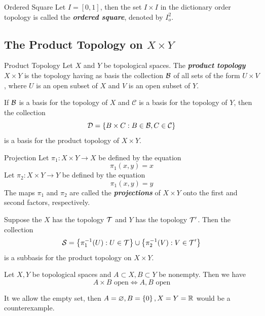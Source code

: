 \documentclass[12pt,a4paper]{article}
\begin{document}
    \begin{defi}{Ordered Square}
        Let $I=[0,1]$, then the set $I\times I$ in the dictionary order topology is called the \textbf{\textit{ordered square}}, denoted by $I_o^2$.
    \end{defi}

    \subsection{The Product Topology on $X\times Y$}
    \begin{defi}{Product Topology}
        Let $X$ and $Y$ be topological spaces. The \textbf{\textit{product topology}} $X\times Y$ is the topology having as basis the collection $\mathcal{B}$ of all sets of the form $U\times V$, where $U$ is an open subset of $X$ and $V$ is an open subset of $Y$.
    \end{defi}
    \hfill

    \begin{thm}
        If $\mathcal{B}$ is a basis for the topology of $X$ and $\mathcal{C}$ is a basis for the topology of $Y$, then the collection
        $$
        \mathcal{D}=\left\{B\times C: B\in\mathcal{B}, C\in\mathcal{C}\right\}
        $$
        is a basis for the product topology of $X\times Y$.
    \end{thm}
    \hfill

    \begin{defi}{Projection}
        Let $\pi_1:X\times Y\to X$ be defined by the equation
        $$
        \pi_1(x,y)=x
        $$
        Let $\pi_2:X\times Y\to Y$ be defined by the equation
        $$
        \pi_1(x,y)=y
        $$
        The maps $\pi_1$ and $\pi_2$ are called the \textbf{\textit{projections}} of $X\times Y$ onto the first and second factors, respectively.
    \end{defi}
    \hfill

    \begin{thm}
        Suppose the $X$ has the topology $\mathcal{T}$ and $Y$ has the topology $\mathcal{T}'$. Then the collection
        $$
        \mathcal{S}=\left\{\pi_1^{-1}(U):U\in\mathcal{T}\right\}\cup\left\{\pi_2^{-1}(V):V\in\mathcal{T}'\right\}
        $$
        is a subbasis for the product topology on $X\times Y$.
    \end{thm}
    \hfill

    \begin{thm}
        Let $X,Y$ be topological spaces and $A\subset X, B\subset Y$ be nonempty. Then we have
        $$
        A\times B\text{ open}\iff A,B\text{ open}
        $$
    \end{thm}
    \begin{remark}
        It we allow the empty set, then $A=\varnothing,B=\left\{0\right\},X=Y=\mathbb{R}$ would be a counterexample.
    \end{remark}
\end{document}

